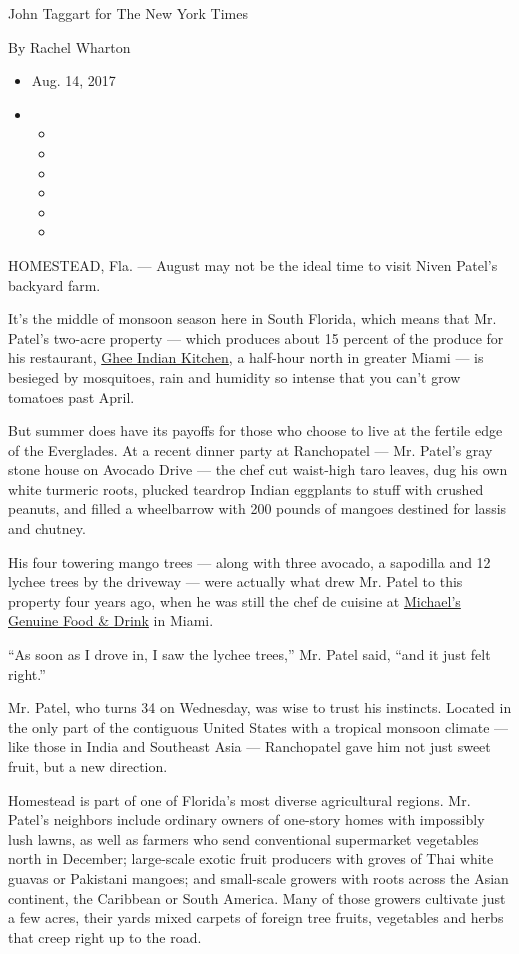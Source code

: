 John Taggart for The New York Times

By Rachel Wharton

\begin{itemize}
\item
  Aug. 14, 2017
\item
  \begin{itemize}
  \item
  \item
  \item
  \item
  \item
  \item
  \end{itemize}
\end{itemize}

HOMESTEAD, Fla. --- August may not be the ideal time to visit Niven
Patel's backyard farm.

It's the middle of monsoon season here in South Florida, which means
that Mr. Patel's two-acre property --- which produces about 15 percent
of the produce for his restaurant, \href{http://gheemiami.com/}{Ghee
Indian Kitchen}, a half-hour north in greater Miami --- is besieged by
mosquitoes, rain and humidity so intense that you can't grow tomatoes
past April.

But summer does have its payoffs for those who choose to live at the
fertile edge of the Everglades. At a recent dinner party at Ranchopatel
--- Mr. Patel's gray stone house on Avocado Drive --- the chef cut
waist-high taro leaves, dug his own white turmeric roots, plucked
teardrop Indian eggplants to stuff with crushed peanuts, and filled a
wheelbarrow with 200 pounds of mangoes destined for lassis and chutney.

His four towering mango trees --- along with three avocado, a sapodilla
and 12 lychee trees by the driveway --- were actually what drew Mr.
Patel to this property four years ago, when he was still the chef de
cuisine at \href{https://michaelsgenuine.com/}{Michael's Genuine Food \&
Drink} in Miami.

``As soon as I drove in, I saw the lychee trees,'' Mr. Patel said, ``and
it just felt right.''

Mr. Patel, who turns 34 on Wednesday, was wise to trust his instincts.
Located in the only part of the contiguous United States with a tropical
monsoon climate --- like those in India and Southeast Asia ---
Ranchopatel gave him not just sweet fruit, but a new direction.

Homestead is part of one of Florida's most diverse agricultural regions.
Mr. Patel's neighbors include ordinary owners of one-story homes with
impossibly lush lawns, as well as farmers who send conventional
supermarket vegetables north in December; large-scale exotic fruit
producers with groves of Thai white guavas or Pakistani mangoes; and
small-scale growers with roots across the Asian continent, the Caribbean
or South America. Many of those growers cultivate just a few acres,
their yards mixed carpets of foreign tree fruits, vegetables and herbs
that creep right up to the road.

